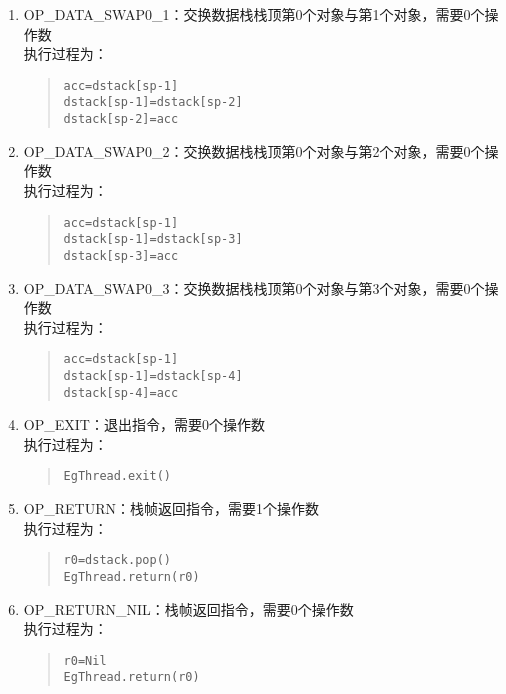 \begin{enumerate}
\item OP\_DATA\_SWAP0\_1：交换数据栈栈顶第0个对象与第1个对象，需要0个操作数 \\
执行过程为：
\begin{quote}
\begin{verbatim}
acc=dstack[sp-1]
dstack[sp-1]=dstack[sp-2]
dstack[sp-2]=acc
\end{verbatim}
\end{quote}

\item OP\_DATA\_SWAP0\_2：交换数据栈栈顶第0个对象与第2个对象，需要0个操作数 \\
执行过程为：
\begin{quote}
\begin{verbatim}
acc=dstack[sp-1]
dstack[sp-1]=dstack[sp-3]
dstack[sp-3]=acc
\end{verbatim}
\end{quote}

\item OP\_DATA\_SWAP0\_3：交换数据栈栈顶第0个对象与第3个对象，需要0个操作数 \\
执行过程为：
\begin{quote}
\begin{verbatim}
acc=dstack[sp-1]
dstack[sp-1]=dstack[sp-4]
dstack[sp-4]=acc
\end{verbatim}
\end{quote}

\item OP\_EXIT：退出指令，需要0个操作数 \\
执行过程为：
\begin{quote}
\begin{verbatim}
EgThread.exit()
\end{verbatim}
\end{quote}

\item OP\_RETURN：栈帧返回指令，需要1个操作数 \\
执行过程为：
\begin{quote}
\begin{verbatim}
r0=dstack.pop()
EgThread.return(r0)
\end{verbatim}
\end{quote}

\item OP\_RETURN\_NIL：栈帧返回指令，需要0个操作数 \\
执行过程为：
\begin{quote}
\begin{verbatim}
r0=Nil
EgThread.return(r0)
\end{verbatim}
\end{quote}
\end{enumerate}




